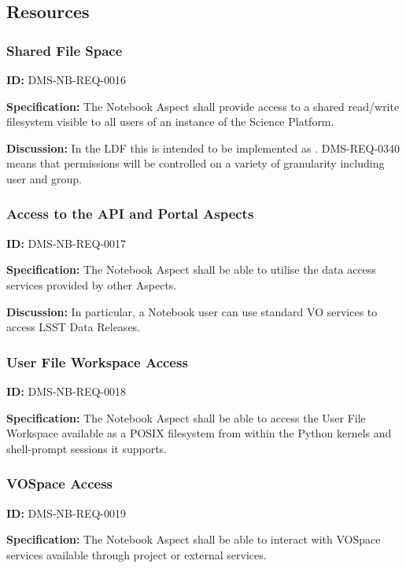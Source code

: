 \documentclass[SE,toc]{lsstdoc}
\begin{document}
\subsection{Resources}

\subsubsection{Shared File Space}

\label{DMS-NB-REQ-0016}
\textbf{ID:} DMS-NB-REQ-0016

\textbf{Specification:}
The Notebook Aspect shall provide access to a shared read/write filesystem visible to all users of an instance of the Science Platform.

\textbf{Discussion:}
In the LDF this is intended to be implemented as .
DMS-REQ-0340 means that permissions will be controlled on a variety of granularity including user and group.

\subsubsection{Access to the API and Portal Aspects}

\label{DMS-NB-REQ-0017}
\textbf{ID:} DMS-NB-REQ-0017

\textbf{Specification:}
The Notebook Aspect shall be able to utilise the data access services provided by other Aspects.

\textbf{Discussion:}
In particular, a Notebook user can use standard VO services to access LSST Data Releases.

\subsubsection{User File Workspace Access}

\label{DMS-NB-REQ-0018}
\textbf{ID:} DMS-NB-REQ-0018

\textbf{Specification:}
The Notebook Aspect shall be able to access the User File Workspace available as a POSIX filesystem from within the Python kernels and shell-prompt sessions it supports.

\subsubsection{VOSpace Access}

\label{DMS-NB-REQ-0019}
\textbf{ID:} DMS-NB-REQ-0019

\textbf{Specification:}
The Notebook Aspect shall be able to interact with VOSpace services available through project or external services.
\end{document}
